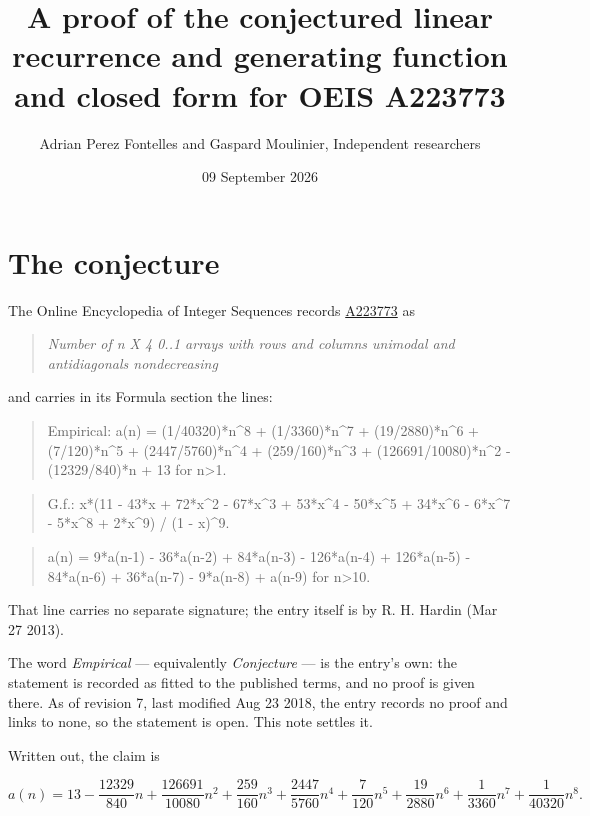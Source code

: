\documentclass[11pt]{article}
\title{A proof of the conjectured linear recurrence and generating function and closed form for OEIS A223773}
\author{Adrian Perez Fontelles and Gaspard Moulinier, Independent researchers}
\date{09 September 2026}
\theoremstyle{definition}
\begin{document}
\maketitle
\section{The conjecture}

The Online Encyclopedia of Integer Sequences records \href{https://oeis.org/A223773}{A223773} as

\begin{quote}\itshape Number of n X 4 0..1 arrays with rows and columns unimodal and antidiagonals nondecreasing\end{quote}

and carries in its Formula section the lines:

\begin{quote}\ttfamily Empirical: a(n) = (1/40320)*n\textasciicircum{}8 + (1/3360)*n\textasciicircum{}7 + (19/2880)*n\textasciicircum{}6 + (7/120)*n\textasciicircum{}5 + (2447/5760)*n\textasciicircum{}4 + (259/160)*n\textasciicircum{}3 + (126691/10080)*n\textasciicircum{}2 - (12329/840)*n + 13 for n>1.\end{quote}

\begin{quote}\ttfamily G.f.: x*(11 - 43*x + 72*x\textasciicircum{}2 - 67*x\textasciicircum{}3 + 53*x\textasciicircum{}4 - 50*x\textasciicircum{}5 + 34*x\textasciicircum{}6 - 6*x\textasciicircum{}7 - 5*x\textasciicircum{}8 + 2*x\textasciicircum{}9) / (1 - x)\textasciicircum{}9.\end{quote}

\begin{quote}\ttfamily a(n) = 9*a(n-1) - 36*a(n-2) + 84*a(n-3) - 126*a(n-4) + 126*a(n-5) - 84*a(n-6) + 36*a(n-7) - 9*a(n-8) + a(n-9) for n>10.\end{quote}

That line carries no separate signature; the entry itself is by R. H. Hardin (Mar 27 2013).

The word {\itshape Empirical} --- equivalently {\itshape Conjecture} --- is the entry's own: the statement is recorded as fitted to the published terms, and no proof is given there. As of revision 7, last modified Aug 23 2018, the entry records no proof and links to none, so the statement is open. This note settles it.

Written out, the claim is

\[a(n) = 13 - \frac{12329}{840}n + \frac{126691}{10080}n^{2} + \frac{259}{160}n^{3} + \frac{2447}{5760}n^{4} + \frac{7}{120}n^{5} + \frac{19}{2880}n^{6} + \frac{1}{3360}n^{7} + \frac{1}{40320}n^{8}.\]
\end{document}
